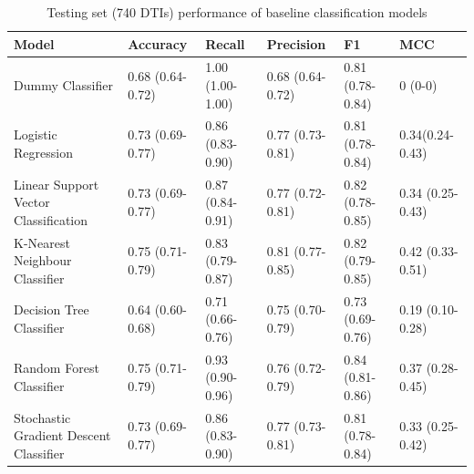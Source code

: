 \bigskip
\bigskip
\bigskip
\bigskip
\bigskip
\bigskip


\begin{table}
    \tabcolsep=0.08cm
    \begin{tabular}{llllll}
    \toprule
                                     Model &        Accuracy  &           Recall &        Precision &               F1 & MCC \\
    \midrule
                          Dummy Classifier & 0.68 (0.64-0.72) & 1.00 (1.00-1.00) & 0.68 (0.64-0.72) & 0.81 (0.78-0.84) &                          0 (0-0) \\
                       Logistic Regression & 0.73 (0.69-0.77) & 0.86 (0.83-0.90) & 0.77 (0.73-0.81) & 0.81 (0.78-0.84) &                  0.34(0.24-0.43) \\
      Linear Support Vector Classification & 0.73 (0.69-0.77) & 0.87 (0.84-0.91) & 0.77 (0.72-0.81) & 0.82 (0.78-0.85) &                 0.34 (0.25-0.43) \\
            K-Nearest Neighbour Classifier & 0.75 (0.71-0.79) & 0.83 (0.79-0.87) & 0.81 (0.77-0.85) & 0.82 (0.79-0.85) &                 0.42 (0.33-0.51) \\
                  Decision Tree Classifier & 0.64 (0.60-0.68) & 0.71 (0.66-0.76) & 0.75 (0.70-0.79) & 0.73 (0.69-0.76) &                 0.19 (0.10-0.28) \\
                  Random Forest Classifier & 0.75 (0.71-0.79) & 0.93 (0.90-0.96) & 0.76 (0.72-0.79) & 0.84 (0.81-0.86) &                 0.37 (0.28-0.45) \\
    Stochastic Gradient Descent Classifier & 0.73 (0.69-0.77) & 0.86 (0.83-0.90) & 0.77 (0.73-0.81) & 0.81 (0.78-0.84) &                 0.33 (0.25-0.42) \\
    \bottomrule
    \end{tabular}
    \caption{Testing set (740 DTIs) performance of baseline classification models}
    \label{tbl:baseline_classification}
\end{table}


